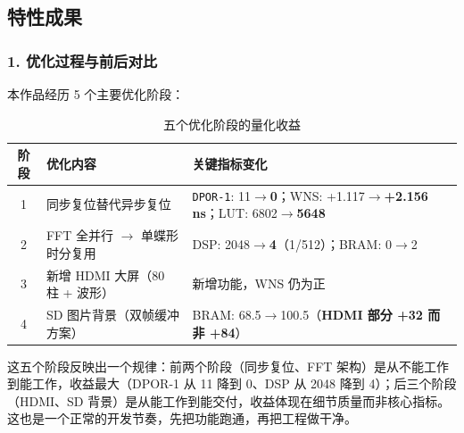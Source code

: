 \documentclass[withoutpreface,bwprint]{cumcmthesis}
\begin{document}

\subsection{特性成果}

\subsubsection*{1. 优化过程与前后对比}

本作品经历 5 个主要优化阶段：

\begin{table}[H]
\centering
\caption{五个优化阶段的量化收益}
\label{tab:opt}
\begin{tabular}{cp{5.4cm}p{8.0cm}}
\toprule[1.5pt]
\rowcolor{gray!25} 阶段 & 优化内容 & 关键指标变化 \\
\midrule[1pt]
1 & 同步复位替代异步复位 & \texttt{DPOR-1}: 11$\rightarrow$\textbf{0}；WNS: +1.117$\rightarrow$\textbf{+2.156\,ns}；LUT: 6802$\rightarrow$\textbf{5648} \\
2 & FFT 全并行 $\rightarrow$ 单蝶形时分复用 & DSP: 2048$\rightarrow$\textbf{4}（1/512）；BRAM: 0$\rightarrow$2 \\
3 & 新增 HDMI 大屏（80 柱 + 波形） & 新增功能，WNS 仍为正 \\
4 & SD 图片背景（双帧缓冲方案） & BRAM: 68.5$\rightarrow$100.5（\textbf{HDMI 部分 +32 而非 +84}）\\
\bottomrule[1.5pt]
\end{tabular}
\end{table}

这五个阶段反映出一个规律：前两个阶段（同步复位、FFT 架构）是从不能工作到能工作，收益最大（DPOR-1 从 11 降到 0、DSP 从 2048 降到 4）；后三个阶段（HDMI、SD 背景）是从能工作到能交付，收益体现在细节质量而非核心指标。这也是一个正常的开发节奏，先把功能跑通，再把工程做干净。
\end{document}
